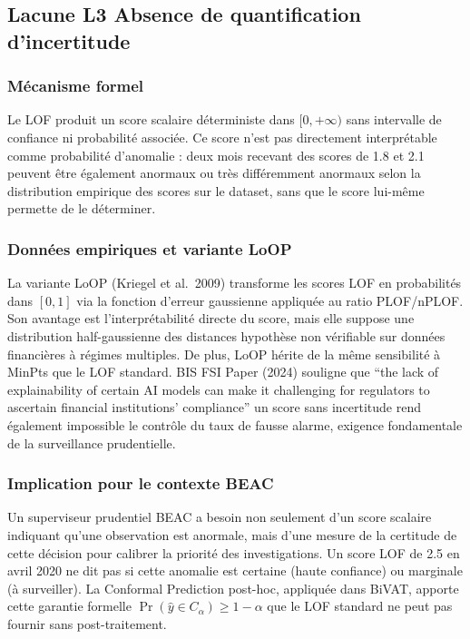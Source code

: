 \documentclass[12pt,a4paper]{article}
\begin{document}
\subsection{Lacune L3  Absence de quantification d'incertitude}

\subsubsection{Mécanisme formel}

Le LOF produit un score scalaire déterministe dans $[0, +\infty)$ sans
intervalle de confiance ni probabilité associée. Ce score n'est pas
directement interprétable comme probabilité d'anomalie : deux mois recevant
des scores de 1.8 et 2.1 peuvent être également anormaux ou très différemment
anormaux selon la distribution empirique des scores sur le dataset, sans que
le score lui-même permette de le déterminer.

\subsubsection{Données empiriques et variante LoOP}

La variante LoOP (Kriegel et al.\ 2009) transforme les scores LOF en
probabilités dans $[0,1]$ via la fonction d'erreur gaussienne appliquée
au ratio PLOF/nPLOF. Son avantage est l'interprétabilité directe du score,
mais elle suppose une distribution half-gaussienne des distances  hypothèse
non vérifiable sur données financières à régimes multiples. De plus, LoOP
hérite de la même sensibilité à MinPts que le LOF standard. BIS FSI Paper
(2024) souligne que ``the lack of explainability of certain AI models can make
it challenging for regulators to ascertain financial institutions' compliance''
 un score sans incertitude rend également impossible le contrôle du taux
de fausse alarme, exigence fondamentale de la surveillance prudentielle.

\subsubsection{Implication pour le contexte BEAC}

Un superviseur prudentiel BEAC a besoin non seulement d'un score scalaire
indiquant qu'une observation est anormale, mais d'une mesure de la certitude
de cette décision pour calibrer la priorité des investigations. Un score LOF
de 2.5 en avril 2020 ne dit pas si cette anomalie est certaine (haute confiance)
ou marginale (à surveiller). La Conformal Prediction post-hoc, appliquée dans
BiVAT, apporte cette garantie formelle $\Pr(\hat{y} \in C_\alpha) \geq 1 -
\alpha$ que le LOF standard ne peut pas fournir sans post-traitement.
\end{document}
